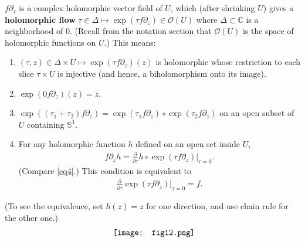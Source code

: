\documentclass[12pt,a4paper,notitlepage]{article}
\theoremstyle{definition}
\newtheorem{rem}[df]{Remark}
\theoremstyle{plain}
\newcommand{\fk}{\mathfrak}
\newcommand{\scr}{\mathscr}
\newcommand{\Cbb}{\mathbb C}
\newcommand{\Sbb}{{\mathbb S}}
\newcommand{\cl}{\mathrm{cl}}
\numberwithin{equation}{section}
\begin{document}
$f\partial_z$ is a complex holomorphic vector field of $U$, which (after shrinking  $U$) gives a \textbf{holomorphic flow} $\tau\in \Delta\mapsto \exp(\tau f\partial_z)\in\scr O(U)$ where $\Delta\subset\Cbb$ is a neighborhood of $0$. (Recall from the notation section that $\scr O(U)$ is the space of holomorphic functions on $U$.) This means:
\begin{enumerate}[label=(\arabic*)]
\item $(\tau,z)\in\Delta\times U\mapsto \exp(\tau f\partial_z)(z)$ is holomorphic whose restriction to each slice $\tau\times U$ is injective (and hence, a biholomorphism onto its image).
\item $\exp(0 f\partial_z)(z)=z$.
\item $\exp((\tau_1+\tau_2)f\partial_z)=\exp(\tau_1 f\partial_z)\circ\exp (\tau_2 f\partial_z)$ on an open subset of $U$ containing $\Sbb^1$.
\item For any holomorphic function $h$ defined on an open set inside $U$,
\begin{align}
f\partial_z h=\frac \partial{\partial\tau} h\circ \exp(\tau f\partial_z)\Big|_{\tau=0}.\label{eq7}
\end{align}
(Compare \eqref{eq4}.) This condition is equivalent to
\begin{align}
\frac \partial{\partial\tau}\exp(\tau f\partial_z)\Big|_{\tau=0}=f.\label{eq8}	
\end{align}
\end{enumerate}
(To see the equivalence, set $h(z)=z$ for one direction, and use chain rule for the other one.)
\begin{align*}
\vcenter{\hbox{{
			\texttt{[image: fig12.png]}}}}	
\end{align*}


\end{document}
